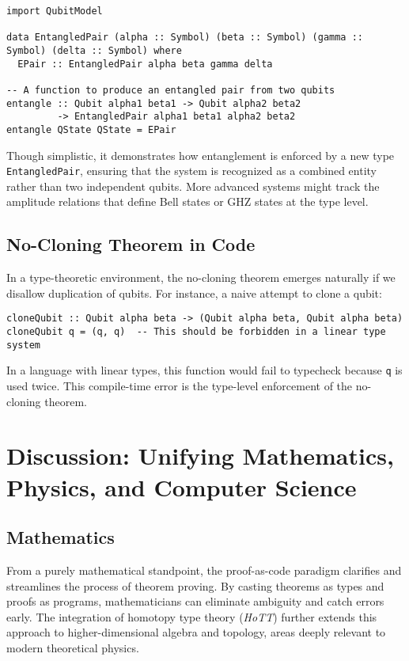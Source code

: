 \documentclass[12pt]{article}
\begin{document}
\begin{itemize}[label=$\bullet$]
\begin{lstlisting}[caption={A simplified entangled pair construction}, label={lst:entanglement}]
import QubitModel

data EntangledPair (alpha :: Symbol) (beta :: Symbol) (gamma :: Symbol) (delta :: Symbol) where
  EPair :: EntangledPair alpha beta gamma delta

-- A function to produce an entangled pair from two qubits
entangle :: Qubit alpha1 beta1 -> Qubit alpha2 beta2
         -> EntangledPair alpha1 beta1 alpha2 beta2
entangle QState QState = EPair
\end{lstlisting}

Though simplistic, it demonstrates how entanglement is enforced by a new type \texttt{EntangledPair}, ensuring that the system is recognized as a combined entity rather than two independent qubits. More advanced systems might track the amplitude relations that define Bell states or GHZ states at the type level.

\subsection{No-Cloning Theorem in Code}
In a type-theoretic environment, the no-cloning theorem emerges naturally if we disallow duplication of qubits. For instance, a naive attempt to clone a qubit:

\begin{lstlisting}[caption={Naive attempt to clone a qubit}, label={lst:clone}]
cloneQubit :: Qubit alpha beta -> (Qubit alpha beta, Qubit alpha beta)
cloneQubit q = (q, q)  -- This should be forbidden in a linear type system
\end{lstlisting}

In a language with linear types, this function would fail to typecheck because \texttt{q} is used twice. This compile-time error is the type-level enforcement of the no-cloning theorem.

\section{Discussion: Unifying Mathematics, Physics, and Computer Science}
\label{sec:discussion}

\subsection{Mathematics}
From a purely mathematical standpoint, the proof-as-code paradigm clarifies and streamlines the process of theorem proving. By casting theorems as types and proofs as programs, mathematicians can eliminate ambiguity and catch errors early. The integration of homotopy type theory (\textit{HoTT}) further extends this approach to higher-dimensional algebra and topology, areas deeply relevant to modern theoretical physics.


\end{itemize}
\end{document}
